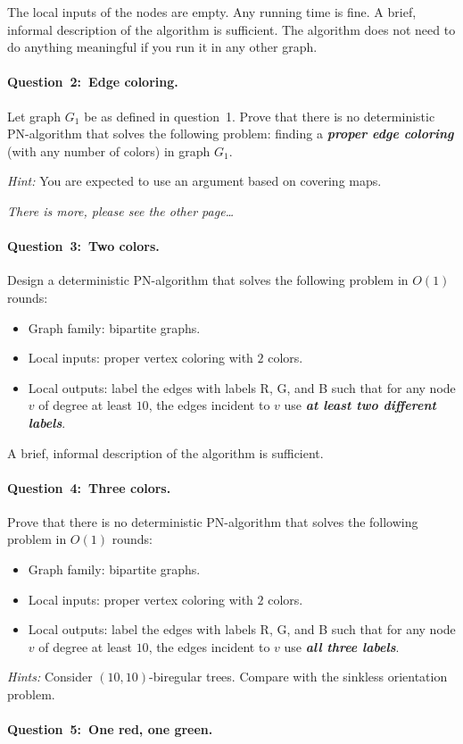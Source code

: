 \documentclass[12pt,a4paper]{article}
\newcommand{\q}[2]{\paragraph{\mbox{Question #1: }#2.}}
\newcommand{\hl}[1]{\textbf{\emph{#1}}}
\begin{document}
The local inputs of the nodes are empty. Any running time is fine. A brief, informal description of the algorithm is sufficient. The algorithm does not need to do anything meaningful if you run it in any other graph.

\q{2}{Edge coloring}

Let graph $G_1$ be as defined in question~1. Prove that there is no deterministic PN-algorithm that solves the following problem: finding a \hl{proper edge coloring} (with any number of colors) in graph $G_1$.

\bigskip\noindent
\emph{Hint:} You are expected to use an argument based on covering maps.

\noindent\emph{There is more, please see the other page\ldots}

\newpage

\q{3}{Two colors}

Design a deterministic PN-algorithm that solves the following problem in $O(1)$ rounds:
\begin{itemize}
    \item Graph family: bipartite graphs.
    \item Local inputs: proper vertex coloring with $2$ colors.
    \item Local outputs: label the edges with labels R, G, and B such that for any node $v$ of degree at least $10$, the edges incident to $v$ use \hl{at least two different labels}.
\end{itemize}
A brief, informal description of the algorithm is sufficient.

\q{4}{Three colors}

Prove that there is no deterministic PN-algorithm that solves the following problem in $O(1)$ rounds:
\begin{itemize}
    \item Graph family: bipartite graphs.
    \item Local inputs: proper vertex coloring with $2$ colors.
    \item Local outputs: label the edges with labels R, G, and B such that for any node $v$ of degree at least $10$, the edges incident to $v$ use \hl{all three labels}.
\end{itemize}
\emph{Hints:} Consider $(10,10)$-biregular trees. Compare with the sinkless orientation problem.

\q{5}{One red, one green}
\end{document}
